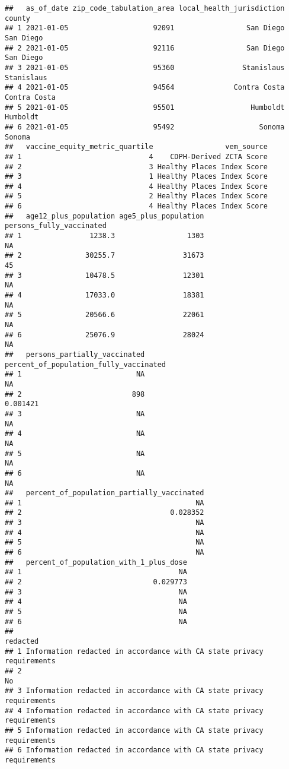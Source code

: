 \documentclass[
]{article}
\begin{document}
\begin{verbatim}
##   as_of_date zip_code_tabulation_area local_health_jurisdiction       county
## 1 2021-01-05                    92091                 San Diego    San Diego
## 2 2021-01-05                    92116                 San Diego    San Diego
## 3 2021-01-05                    95360                Stanislaus   Stanislaus
## 4 2021-01-05                    94564              Contra Costa Contra Costa
## 5 2021-01-05                    95501                  Humboldt     Humboldt
## 6 2021-01-05                    95492                    Sonoma       Sonoma
##   vaccine_equity_metric_quartile                 vem_source
## 1                              4    CDPH-Derived ZCTA Score
## 2                              3 Healthy Places Index Score
## 3                              1 Healthy Places Index Score
## 4                              4 Healthy Places Index Score
## 5                              2 Healthy Places Index Score
## 6                              4 Healthy Places Index Score
##   age12_plus_population age5_plus_population persons_fully_vaccinated
## 1                1238.3                 1303                       NA
## 2               30255.7                31673                       45
## 3               10478.5                12301                       NA
## 4               17033.0                18381                       NA
## 5               20566.6                22061                       NA
## 6               25076.9                28024                       NA
##   persons_partially_vaccinated percent_of_population_fully_vaccinated
## 1                           NA                                     NA
## 2                          898                               0.001421
## 3                           NA                                     NA
## 4                           NA                                     NA
## 5                           NA                                     NA
## 6                           NA                                     NA
##   percent_of_population_partially_vaccinated
## 1                                         NA
## 2                                   0.028352
## 3                                         NA
## 4                                         NA
## 5                                         NA
## 6                                         NA
##   percent_of_population_with_1_plus_dose
## 1                                     NA
## 2                               0.029773
## 3                                     NA
## 4                                     NA
## 5                                     NA
## 6                                     NA
##                                                                redacted
## 1 Information redacted in accordance with CA state privacy requirements
## 2                                                                    No
## 3 Information redacted in accordance with CA state privacy requirements
## 4 Information redacted in accordance with CA state privacy requirements
## 5 Information redacted in accordance with CA state privacy requirements
## 6 Information redacted in accordance with CA state privacy requirements
\end{verbatim}
\end{document}
